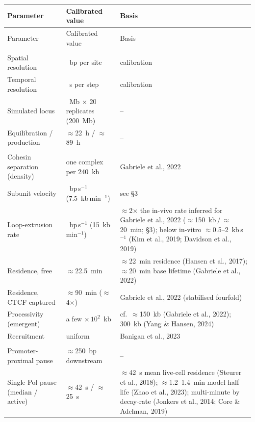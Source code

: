 \documentclass[11pt]{article}
\begin{document}
\medskip
\setlength{\LTleft}{0pt}\setlength{\LTright}{\fill}
\begin{longtable}{@{}>{\raggedright\arraybackslash}p{3.7cm} >{\raggedright\arraybackslash}p{3.4cm} >{\raggedright\arraybackslash}p{7.3cm}@{}}
\toprule
Parameter & Calibrated value & Basis \\
\midrule
\endfirsthead
\toprule
Parameter & Calibrated value & Basis \\
\midrule
\endhead
\bottomrule
\endlastfoot
\multicolumn{3}{@{}l}{\textit{System}}\\
Spatial resolution & 250~bp per site & calibration \\
Temporal resolution & 2~s per step & calibration \\
Simulated locus & 10~Mb $\times$ 20 replicates (200~Mb) & -- \\
Equilibration / production & $\approx$22~h / $\approx$89~h & -- \\
\addlinespace
\multicolumn{3}{@{}l}{\textit{Loop extrusion}}\\
Cohesin separation (density) & one complex per 240~kb & Gabriele et al., 2022 \\
Subunit velocity & 125~bp\,s$^{-1}$ (7.5~kb\,min$^{-1}$) & see \S3 \\
Loop-extrusion rate & 250~bp\,s$^{-1}$ (15~kb\,min$^{-1}$) & $\approx$2$\times$ the in-vivo rate inferred for Gabriele et al., 2022 ($\approx$150~kb\,/\,$\approx$20~min; \S3); below in-vitro $\approx$0.5--2~kb\,s$^{-1}$ (Kim et al., 2019; Davidson et al., 2019) \\
Residence, free & $\approx$22.5~min & $\approx$22~min residence (Hansen et al., 2017); $\approx$20~min base lifetime (Gabriele et al., 2022) \\
Residence, CTCF-captured & $\approx$90~min ($\approx$4$\times$) & Gabriele et al., 2022 (stabilised fourfold) \\
Processivity (emergent) & a few $\times\,10^{2}$~kb & cf.\ $\approx$150~kb (Gabriele et al., 2022); 300~kb (Yang \& Hansen, 2024) \\
Recruitment & uniform & Banigan et al., 2023 \\
\addlinespace
\multicolumn{3}{@{}l}{\textit{Transcription}}\\
Promoter-proximal pause & $\approx$250~bp downstream & -- \\
Single-Pol pause (median / active) & $\approx$42~s / $\approx$25~s & $\approx$42~s mean live-cell residence (Steurer et al., 2018); $\approx$1.2--1.4~min model half-life (Zhao et al., 2023); multi-minute by decay-rate (Jonkers et al., 2014; Core \& Adelman, 2019) \\

\end{longtable}
\end{document}
